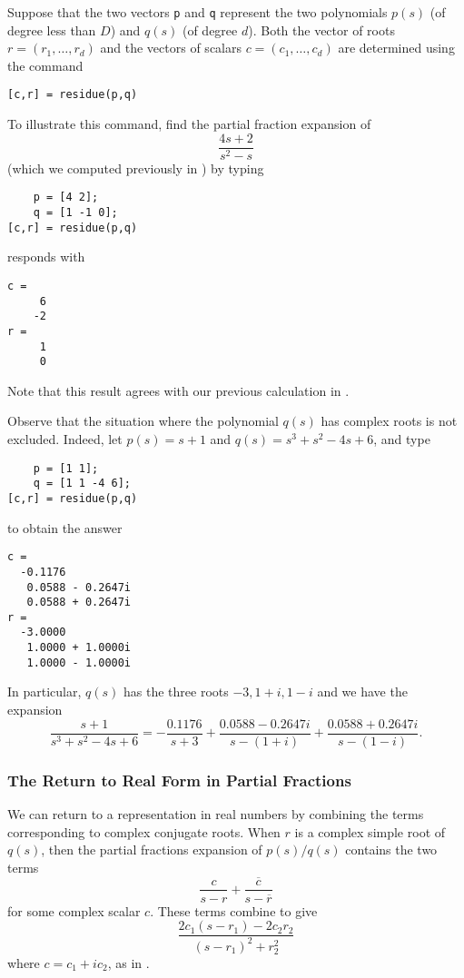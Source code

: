 Suppose that the two vectors {\tt p} and {\tt q} represent the two polynomials 
$p(s)$ (of degree less than $D$) and $q(s)$ (of degree $d$).  Both the vector 
of roots $r=(r_1,\ldots,r_d)$ and the vectors of scalars $c=(c_1,\ldots,c_d)$ 
are determined using the command 
\begin{verbatim}
[c,r] = residue(p,q)
\end{verbatim}

To illustrate this command, find the partial fraction expansion of 
\[
\frac{4s+2}{s^2-s}
\]
(which we computed previously in ) by typing
\begin{verbatim}
    p = [4 2];
    q = [1 -1 0];
[c,r] = residue(p,q)
\end{verbatim}
\Matlab responds with
\begin{verbatim}
c =
     6
    -2
r =
     1
     0
\end{verbatim}
Note that this result agrees with our previous calculation in .

Observe that the situation where the polynomial $q(s)$ has complex roots 
is not excluded.  Indeed, let $p(s) = s+1$ and $q(s) = s^3+s^2-4s+6$, and type
\begin{verbatim}
    p = [1 1];
    q = [1 1 -4 6];
[c,r] = residue(p,q)
\end{verbatim}
to obtain the answer
\begin{verbatim}
c =
  -0.1176          
   0.0588 - 0.2647i
   0.0588 + 0.2647i
r =
  -3.0000          
   1.0000 + 1.0000i
   1.0000 - 1.0000i
\end{verbatim}
In particular, $q(s)$ has the three roots $-3,1+i,1-i$ and we have
the expansion
\begin{equation}   \label{e:realfex}
\frac{s+1}{s^3+s^2-4s+6} = -\frac{0.1176}{s+3}+\frac{0.0588 - 0.2647i}{s-(1+i)}+
\frac{0.0588 + 0.2647i}{s-(1-i)}.
\end{equation}

\subsubsection*{The Return to Real Form in Partial Fractions}

We can return to a representation in real numbers by combining the terms 
corresponding to complex conjugate roots.  When $r$ is a complex simple root 
of $q(s)$, then the partial fractions expansion of $p(s)/q(s)$ contains 
the two terms
\[
\frac{c}{s-r} + \frac{\overline{c}}{s-\overline{r}}
\]
for some complex scalar $c$.  These terms combine to give
\[
\frac{2c_1(s-r_1)-2c_2r_2}{(s-r_1)^2+r_2^2}
\]
where $c=c_1+ic_2$, as in .


